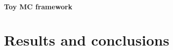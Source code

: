 \begin{refsection}
        \paragraph{Toy MC framework}

\section{Results and conclusions}

\cite{X17:1996} \cite{X17:nuclear:2004} \cite{X17:Krasznahorkay:2015} \cite{X17:Ellwanger:2016} \cite{X17:Feng:2016} \cite{X17_Kozaczuk:2017} \cite{X17:Krasznahorkay:2017} \cite{X17:2019} \cite{X17:2021} 

\printbibliography[
    heading = bibliographychapter,
    title=Bibliography on X17
]

\end{refsection}
